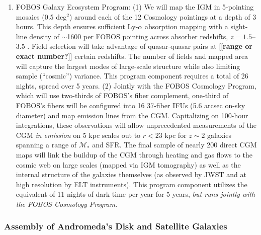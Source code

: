 \documentclass[oneside,11pt]{amsart}
\newcommand{\comment}[2][todo]{{\color{#1}[[{\bf #2}]]}}
\newcounter{chalno}
\newcommand{\chal}[1]{\refstepcounter{chalno}\label{#1}}
\begin{document}

\chal{phot}
%
\begin{enumerate}[rightmargin=0.2cm,leftmargin=0.2cm]
%
\item[] {\textsf {\large FOBOS Galaxy Ecosystem Program:}} (1) We
will map the IGM in 5-pointing mosaics (0.5 deg$^2$) around each of
the 12 Cosmology pointings at a depth of 3 hours. This depth ensures
sufficient Ly-$\alpha$ absorption mapping with a sight-line density
of $\sim$1600 per FOBOS pointing across absorber redshifts, $z =
1.5$--3.5 \citep[see][]{lee16}. Field selection will take advantage
of quasar-quasar pairs at \comment{range or exact number?} certain
redshifts. The number of fields and mapped area will capture the
largest modes of large-scale structure while also limiting sample
(``cosmic'') variance. This program component requires a total of 26
nights, spread over 5 years. (2) Jointly with the FOBOS Cosmology
Program, which will use two-thirds of FOBOS's fiber complement,
one-third of FOBOS's fibers will be configured into 16 37-fiber IFUs
(5.6 arcsec on-sky diameter) and map emission lines from the CGM.
Capitalizing on 100-hour integrations, these observations will allow
unprecedented measurements of the CGM {\it in emission} on 5 kpc
scales out to $r < 23$ kpc for $z \sim 2$ galaxies spanning a range
of $\mathcal{M}_*$ and SFR. The final sample of nearly 200 direct CGM
maps will link the buildup of the CGM through heating and gas flows
to the cosmic web on large scales (mapped via IGM tomography) as well
as the internal structure of the galaxies themselves (as observed by
JWST and at high resolution by ELT instruments). This program component
utilizes the equivalent of 11 nights of dark time per year for 5
years, {\it but runs jointly with the FOBOS Cosmology Program}.
%
\end{enumerate}

\subsubsection{Assembly of Andromeda's Disk and Satellite Galaxies}
\label{sec:localgroup}
\end{document}
